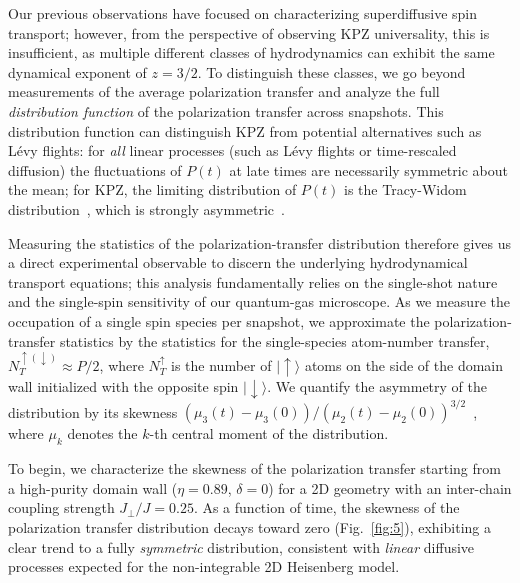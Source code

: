 \documentclass[
 reprint,
 superscriptaddress,
 amsmath,amssymb,
 aps,
 pra,
]{revtex4-2}
\newcommand{\ket}[1]{\ensuremath{\lvert #1 \rangle}\xspace}%
\begin{document}

Our previous observations have focused on characterizing superdiffusive spin transport;
however, from the perspective of observing KPZ universality, this is insufficient, as multiple different classes of hydrodynamics can exhibit the same dynamical exponent of $z = 3/2$.
%
To distinguish these classes, we go beyond measurements of the average polarization transfer and analyze the full \emph{distribution function} of the polarization transfer across snapshots.
%
This distribution function can distinguish KPZ from potential alternatives such as L\'evy flights:
for \emph{all} linear processes (such as L\'evy flights or time-rescaled diffusion) the fluctuations of $P(t)$ at late times are necessarily symmetric about the mean;
for KPZ, the limiting distribution of $P(t)$ is the Tracy-Widom distribution~\cite{SI}, which is strongly asymmetric~\cite{Prahofer2000,Spohn2020}.


Measuring the statistics of the polarization-transfer distribution therefore gives us a direct experimental observable to discern the underlying hydrodynamical transport equations;
this analysis fundamentally relies on the single-shot nature and the single-spin sensitivity of our quantum-gas microscope.
%
As we measure the occupation of a single spin species per snapshot, we approximate the polarization-transfer statistics by the statistics for the single-species atom-number transfer, $N_T^{\uparrow (\downarrow)} \approx P / 2$, where $N_T^{\uparrow}$ is the number of $\ket{\uparrow}$ atoms on the side of the domain wall initialized with the opposite spin $\ket{\downarrow}$.
%
We quantify the asymmetry of the distribution by its skewness $(\mu_3(t) - \mu_3(0)) / (\mu_2(t) - \mu_2(0))^{3/2}$~\cite{SI}, where $\mu_k$ denotes the $k$-th central moment of the distribution.


To begin, we characterize the skewness of the polarization transfer starting from a high-purity domain wall ($\eta = 0.89$, $\delta=0$) for a 2D geometry with an inter-chain coupling strength $J_\perp / J = 0.25$.
%
As a function of time, the skewness of the polarization transfer distribution decays toward zero (Fig.~\ref{fig:5}), exhibiting a clear trend to a fully \emph{symmetric} distribution, consistent with \emph{linear} diffusive processes expected for the non-integrable 2D Heisenberg model.
\end{document}
